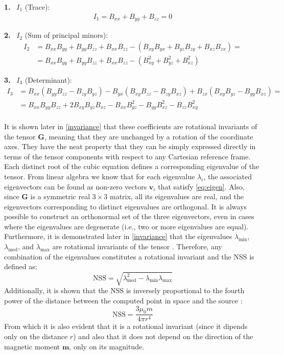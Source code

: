 \noindent
\textbf{1.} \, \( I_1 \) (Trace):
\begin{align*}
    I_1 = B_{xx} + B_{yy} + B_{zz} = 0
\end{align*}

\noindent
\textbf{2.} \, \( I_2 \) (Sum of principal minors):
\begin{align*}
    I_2 &= B_{xx}B_{yy} + B_{yy}B_{zz} + B_{xx}B_{zz} 
        - (B_{xy}B_{yx} + B_{yz}B_{zy} + B_{xz}B_{zx}) = \\
        &= B_{xx}B_{yy} + B_{yy}B_{zz} + B_{xx}B_{zz} 
         - (B_{xy}^2 + B_{yz}^2 + B_{xz}^2)
\end{align*}

\noindent
\textbf{3.} \, \( I_3 \) (Determinant):
\begin{align*}
    I_3 &= B_{xx} (B_{yy} B_{zz} - B_{zy} B_{yz}) 
    - B_{yx} (B_{xy} B_{zz} - B_{zy} B_{xz}) 
    + B_{zx} (B_{xy} B_{yz} - B_{yy} B_{xz}) = \\
        &= B_{xx}B_{yy}B_{zz} + 2B_{xy}B_{yz}B_{xz} - 
        B_{xx}B_{yz}^2 - B_{yy}B_{xz}^2 - B_{zz}B_{xy}^2
\end{align*}
\\
It is shown later in \ref{invariance} that these coefficients are rotational invariants of 
the tensor \( \mathbf{G} \), meaning that they are unchanged by a 
rotation of the coordinate axes. They have the neat property that they can be simply expressed
directly in terms of the tensor components with respect to any
Cartesian reference frame.
Each distinct root of the cubic equation defines a corresponding 
eigenvalue of the tensor. From linear algebra we know that for each eigenvalue \( \lambda_i \), the 
associated eigenvectors can be found as non-zero vectors 
\( \mathbf{v}_i \) that satisfy \ref{eq:eigen}.
Also, since \( \mathbf{G} \) is a symmetric real \( 3 \times 3 \) matrix, 
all its eigenvalues are real, and the eigenvectors corresponding to 
distinct eigenvalues are orthogonal. It is always possible to construct 
an orthonormal set of the three eigenvectors, even in cases where the 
eigenvalues are degenerate (i.e., two or more eigenvalues are equal).
Furthermore, it is demonstrated later in \ref{invariance} that the eigenvalues \( \lambda_{\text{min}} \), 
\( \lambda_{\text{med}} \), and \( \lambda_{\text{max}} \) are rotational 
invariants of the tensor \cite{NSS_single_different_dimensions}.
Therefore, any combination of the eigenvalues 
constitutes a rotational invariant and the NSS is defined as:
\begin{equation}
\text{NSS} = \sqrt{\lambda_{\text{med}}^2 - \lambda_{\text{min}} \lambda_{\text{max}}}
\label{eq:NSS}
\end{equation}
Additionally, it is shown that the NSS is inversely proportional to the fourth power of 
the distance between the computed point in space and the source \cite{NSS_single_localization}:
\begin{equation}
\text{NSS} = \frac{3 \mu_0 m}{4 \pi r^4}
\end{equation}
From which it is also evident that it is a rotational invariant (since it dipends
only on the distance $r$) and also that it does not depend on the direction of the magnetic
moment $\mathbf{m}$, only on its magnitude.
\\

